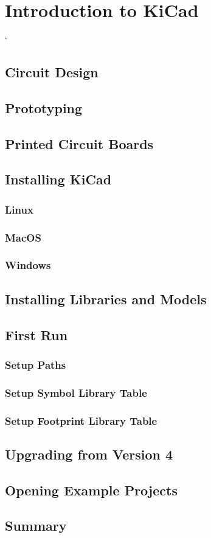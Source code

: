 
\chapter{Introduction to KiCad}
\label{ch:intro-kicad}

`

\section{Circuit Design}


\section{Prototyping}

\section{Printed Circuit Boards}

\section{Installing KiCad}
\subsection{Linux}
\subsection{MacOS}
\subsection{Windows}

\section{Installing Libraries and Models}

\section{First Run}
\subsection{Setup Paths}
\subsection{Setup Symbol Library Table}
\subsection{Setup Footprint Library Table}

\section{Upgrading from Version 4}

\section{Opening Example Projects}

\section{Summary}
